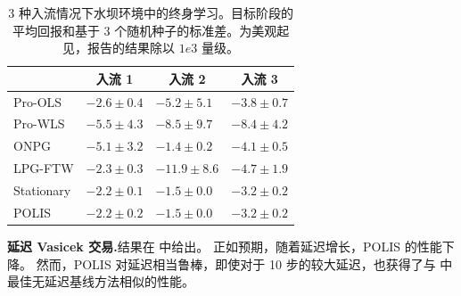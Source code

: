 \begin{table}[t]
    \centering
    \begin{tabular}{l|lll}
          & \multicolumn{1}{c}{入流 1}       & \multicolumn{1}{c}{入流 2}        & \multicolumn{1}{c}{入流 3}
        \\ \hline\hline
        Pro-OLS&$-2.6 \pm 0.4$&$-5.2 \pm 5.1$&$-3.8 \pm 0.7$\\
        Pro-WLS&$-5.5 \pm 4.3$&$-8.5 \pm 9.7$&$-8.4 \pm 4.2$\\
        ONPG&$-5.1 \pm 3.2$&$-1.4 \pm 0.2$&$-4.1 \pm 0.5$\\
        LPG-FTW&$-2.3 \pm 0.3$&$-11.9 \pm 8.6$&$-4.7 \pm 1.9$\\
        Stationary&$-2.2 \pm 0.1$&$-1.5 \pm 0.0$&$-3.2 \pm 0.2$\\
        POLIS&$-2.2 \pm 0.2$&$-1.5 \pm 0.0$&$-3.2 \pm 0.2$\\
    \end{tabular}
    \caption{3 种入流情况下水坝环境中的终身学习。目标阶段的平均回报和基于 3 个随机种子的标准差。为美观起见，报告的结果除以 $1e3$ 量级。}\label{tab:exp_dam}
\end{table}







\noindent\textbf{延迟 Vasicek 交易.}\indent 结果在  中给出。
正如预期，随着延迟增长，POLIS 的性能下降。
然而，POLIS 对延迟相当鲁棒，即使对于 10 步的较大延迟，也获得了与  中最佳无延迟基线方法相似的性能。

